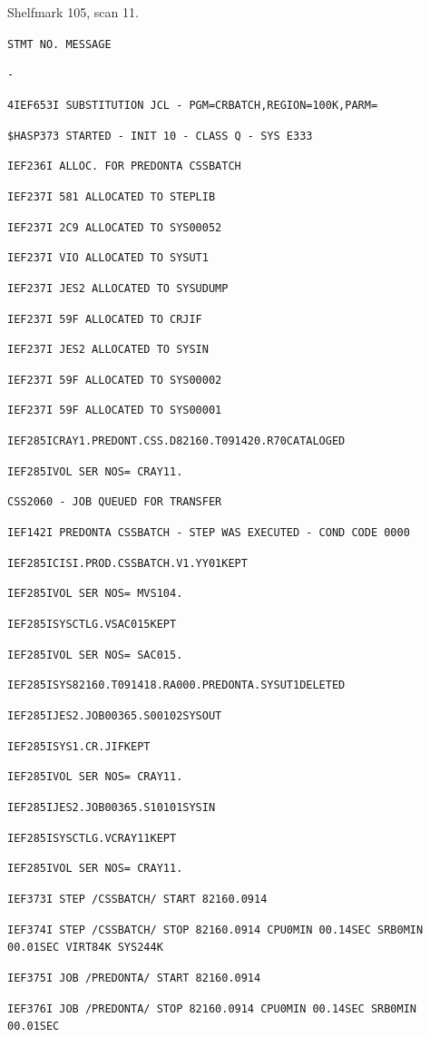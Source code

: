 Shelfmark 105, scan 11.


\texttt{STMT NO. MESSAGE}

\texttt{-}

\texttt{4\quad IEF653I SUBSTITUTION JCL - PGM=CRBATCH,REGION=100K,PARM=}

\texttt{\$HASP373 STARTED - INIT 10 - CLASS Q - SYS E333}

\texttt{IEF236I ALLOC. FOR PREDONTA CSSBATCH}

\texttt{IEF237I 581 ALLOCATED TO STEPLIB}

\texttt{IEF237I 2C9 ALLOCATED TO SYS00052}

\texttt{IEF237I VIO ALLOCATED TO SYSUT1}

\texttt{IEF237I JES2 ALLOCATED TO SYSUDUMP}

\texttt{IEF237I 59F ALLOCATED TO CRJIF}

\texttt{IEF237I JES2 ALLOCATED TO SYSIN}

\texttt{IEF237I 59F ALLOCATED TO SYS00002}

\texttt{IEF237I 59F ALLOCATED TO SYS00001}

\texttt{IEF285I\quad CRAY1.PREDONT.CSS.D82160.T091420.R70\quad CATALOGED}

\texttt{IEF285I\quad VOL SER NOS= CRAY11.}

\texttt{CSS2060 - JOB QUEUED FOR TRANSFER}

\texttt{IEF142I PREDONTA CSSBATCH - STEP WAS EXECUTED - COND CODE 0000}

\texttt{IEF285I\quad CISI.PROD.CSSBATCH.V1.YY01\quad KEPT}

\texttt{IEF285I\quad VOL SER NOS= MVS104.}

\texttt{IEF285I\quad SYSCTLG.VSAC015\quad KEPT}

\texttt{IEF285I\quad VOL SER NOS= SAC015.}

\texttt{IEF285I\quad SYS82160.T091418.RA000.PREDONTA.SYSUT1\quad DELETED}

\texttt{IEF285I\quad JES2.JOB00365.S00102\quad SYSOUT}

\texttt{IEF285I\quad SYS1.CR.JIF\quad KEPT}

\texttt{IEF285I\quad VOL SER NOS= CRAY11.}

\texttt{IEF285I\quad JES2.JOB00365.S10101\quad SYSIN}

\texttt{IEF285I\quad SYSCTLG.VCRAY11\quad KEPT}

\texttt{IEF285I\quad VOL SER NOS= CRAY11.}

\texttt{IEF373I STEP /CSSBATCH/ START 82160.0914}

\texttt{IEF374I STEP /CSSBATCH/ STOP 82160.0914 CPU\quad 0MIN 00.14SEC SRB\quad 0MIN 00.01SEC VIRT\quad 84K SYS\quad 244K}

\texttt{IEF375I JOB /PREDONTA/ START 82160.0914}

\texttt{IEF376I JOB /PREDONTA/ STOP 82160.0914 CPU\quad 0MIN 00.14SEC SRB\quad 0MIN 00.01SEC}
